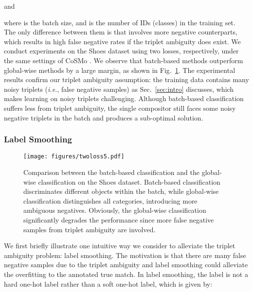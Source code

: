 \documentclass[sigconf]{acmart}
\def\ie{\emph{i.e.}}
\begin{document}
and

where  is the batch size, and  is the number of IDs (classes) in the training set. The only difference between them is that  involves more negative counterparts, which results in high false negative rates if the triplet ambiguity does exist. We conduct experiments on the Shoes dataset \cite{berg2010automatic} using two losses, respectively, under the same settings of CoSMo \cite{lee2021cosmo}. We observe that batch-based methods outperform global-wise methods by a large margin, as shown in Fig.~\ref{fig:twolosses}. The experimental results confirm our triplet ambiguity assumption: the training data contains many noisy triplets (\ie, false negative samples) as Sec.~\ref{sec:intro} discusses, which makes learning on noisy triplets challenging. Although batch-based classification suffers less from triplet ambiguity, the single compositor still faces some noisy negative triplets in the batch and produces a sub-optimal solution.

\subsubsection{Label Smoothing}
\label{subsubsec:smoothing}
\begin{figure}[t!]
    \centering
    \texttt{[image: figures/twoloss5.pdf]}
    \caption{Comparison between the batch-based classification and the global-wise classification on the Shoes dataset. Batch-based classification discriminates different objects within the batch, while global-wise classification distinguishes all categories, introducing more ambiguous negatives. Obviously, the global-wise classification significantly degrades the performance since more false negative samples from triplet ambiguity are involved.}
    \label{fig:twolosses}
\end{figure}

We first briefly illustrate one intuitive way we consider to alleviate the triplet ambiguity problem: label smoothing. The motivation is that there are many false negative samples due to the triplet ambiguity and label smoothing could alleviate the overfitting to the annotated true match. In label smoothing, the label  is not a hard one-hot label rather than a soft one-hot label, which is given by:
\end{document}
